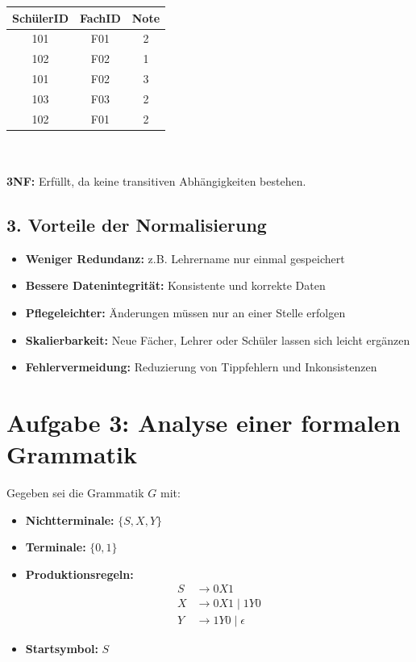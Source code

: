 \documentclass[a4paper,12pt]{article}
\begin{document}
		\begin{tabular}{|c|c|c|}
			\hline
			\textbf{SchülerID} & \textbf{FachID} & \textbf{Note} \\
			\hline
			101 & F01 & 2 \\
			102 & F02 & 1 \\
			101 & F02 & 3 \\
			103 & F03 & 2 \\
			102 & F01 & 2 \\
			\hline
		\end{tabular}
		\\
		\\ \textbf{3NF:} Erfüllt, da keine transitiven Abhängigkeiten bestehen.
		
		\subsection*{3. Vorteile der Normalisierung}
		
		\begin{itemize}
			\item \textbf{Weniger Redundanz:} z.B. Lehrername nur einmal gespeichert
			\item \textbf{Bessere Datenintegrität:} Konsistente und korrekte Daten
			\item \textbf{Pflegeleichter:} Änderungen müssen nur an einer Stelle erfolgen
			\item \textbf{Skalierbarkeit:} Neue Fächer, Lehrer oder Schüler lassen sich leicht ergänzen
			\item \textbf{Fehlervermeidung:} Reduzierung von Tippfehlern und Inkonsistenzen
		\end{itemize}
\newpage				
\section*{Aufgabe 3: Analyse einer formalen Grammatik}

Gegeben sei die Grammatik \( G \) mit:

\begin{itemize}
	\item \textbf{Nichtterminale:} \( \{S, X, Y\} \)
	\item \textbf{Terminale:} \( \{0, 1\} \)
	\item \textbf{Produktionsregeln:}
	\begin{align*}
		S &\rightarrow 0 X 1 \\
		X &\rightarrow 0 X 1 \mid 1 Y 0 \\
		Y &\rightarrow 1 Y 0 \mid \epsilon
	\end{align*}
	\item \textbf{Startsymbol:} \( S \)
\end{itemize}
\end{document}
